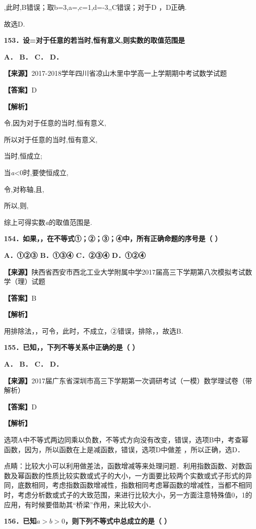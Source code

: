 \documentclass[
]{article}
\begin{document}
,此时,B错误；取b=3,a=,c=1,d=-3,,C错误；对于D ，D正确.

故选D.

\textbf{153．设=对于任意的若当时,恒有意义,则实数的取值范围是}

\textbf{A． B． C． D．}

\textbf{【来源】}2017-2018学年四川省凉山木里中学高一上学期期中考试数学试题

\textbf{【答案】}D

\textbf{【解析】}

令,因为对于任意的当时,恒有意义,

所以对于任意的当时,恒有意义,

当时,恒成立;

当\emph{a}\textless0时,要使恒成立,

令,对称轴,且,

所以,则,

综上可得实数\emph{a}的取值范围是.

\textbf{154．如果，，在不等式①；②；③；④中，所有正确命题的序号是（ ）}

\textbf{A．①②③ B．①③④ C．②③④ D．①②④}

\textbf{【来源】}陕西省西安市西北工业大学附属中学2017届高三下学期第八次模拟考试数学（理）试题

\textbf{【答案】}B

\textbf{【解析】}

用排除法，，可令，此时，不成立，②错误，排除，，故选B.

\textbf{155．已知，，下列不等关系中正确的是（ ）}

\textbf{A． B． C． D．}

\textbf{【来源】}2017届广东省深圳市高三下学期第一次调研考试（一模）数学理试卷（带解析）

\textbf{【答案】}D

\textbf{【解析】}

选项A中不等式两边同乘以负数，不等式方向没有改变，错误，选项B中，考查幂函数，因为，所以函数在上是减函数，错误，选项D中做差
，所以正确，选D．

点睛：比较大小可以利用做差法，函数增减等来处理问题．利用指数函数、对数函数及幂函数的性质比较实数或式子的大小，一方面要比较两个实数或式子形式的异同，底数相同，考虑指数函数增减性，指数相同考虑幂函数的增减性，当都不相同时，考虑分析数或式子的大致范围，来进行比较大小，另一方面注意特殊值0，1的应用，有时候要借助其``桥梁''作用，来比较大小．

\textbf{156．已知}\(a > b > 0\)\textbf{，则下列不等式中总成立的是（ ）}
\end{document}
